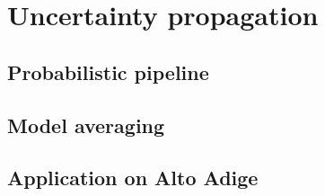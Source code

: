 \chapter{Uncertainty propagation}

\ifpdf
    \graphicspath{{Chapter4/Figs/Raster/}{Chapter4/Figs/PDF/}{Chapter4/Figs/}}
\else
    \graphicspath{{Chapter4/Figs/Vector/}{Chapter4/Figs/}}
\fi

\section{Probabilistic pipeline} %


\section{Model averaging} %


\section{Application on Alto Adige} %